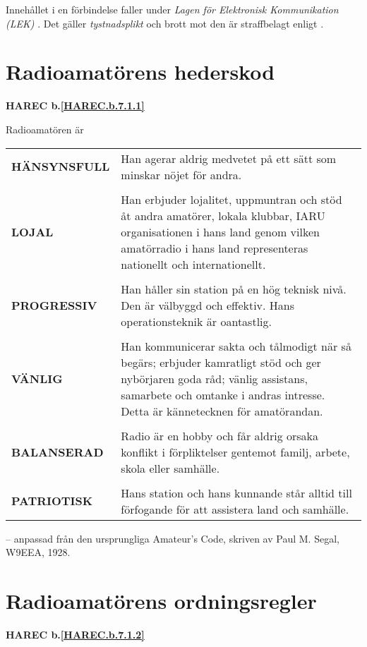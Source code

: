 Innehållet i en förbindelse faller under
\emph{Lagen för Elektronisk Kommunikation (LEK)} \cite{SFS2003:389}.
Det gäller \emph{tystnadsplikt} \cite[kap 6, \S23]{SFS2003:389} och
brott mot den är straffbelagt enligt \cite[kap 7, \S14]{SFS2003:389}.

\section[Hederskod]{Radioamatörens hederskod}
\textbf{HAREC
  b.\ref{HAREC.b.7.1.1}\label{myHAREC.b.7.1.1}
}

Radioamatören är

\begin{tabular}{lp{9cm}}
  \textbf{HÄNSYNSFULL} &
     Han agerar aldrig medvetet på ett sätt som minskar nöjet för andra. \\
  & \\

  \textbf{LOJAL} &
  Han erbjuder lojalitet, uppmuntran och stöd åt andra amatörer, lokala klubbar,
  IARU organisationen i hans land genom vilken amatörradio i hans land
  representeras nationellt och internationellt.\\
  & \\

  \textbf{PROGRESSIV} &
  Han håller sin station på en hög teknisk nivå.
  Den är välbyggd och effektiv.
  Hans operationsteknik är oantastlig.\\
  & \\

  \textbf{VÄNLIG} &
  Han kommunicerar sakta och tålmodigt när så begärs;
  erbjuder kamratligt stöd och ger nybörjaren goda råd;
  vänlig assistans, samarbete och omtanke i andras intresse.
  Detta är kännetecknen för amatörandan.\\
  & \\

  \textbf{BALANSERAD} &
  Radio är en hobby och får aldrig orsaka konflikt i förpliktelser gentemot
  familj, arbete, skola eller samhälle.\\
  & \\

  \textbf{PATRIOTISK} &
  Hans station och hans kunnande står alltid till förfogande för att
  assistera land och samhälle.\\
\end{tabular}

-- anpassad från den ursprungliga Amateur's Code, skriven av Paul M. Segal, W9EEA, 1928.

\section[Ordningsregler]{Radioamatörens ordningsregler}
\textbf{HAREC
  b.\ref{HAREC.b.7.1.2}\label{myHAREC.b.7.1.2}
}

